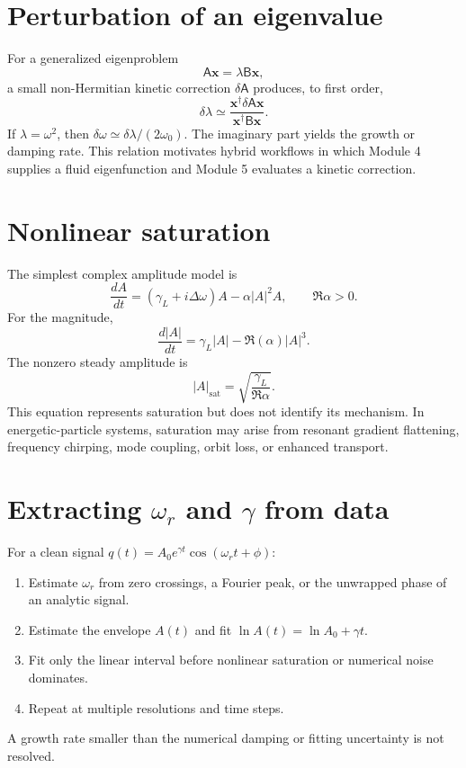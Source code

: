 \documentclass[11pt]{article}
\begin{document}
\section{Perturbation of an eigenvalue}
For a generalized eigenproblem
\begin{equation}
\mathsf A\mathbf x=\lambda\mathsf B\mathbf x,
\end{equation}
a small non-Hermitian kinetic correction $\delta\mathsf A$ produces, to first order,
\begin{equation}
\delta\lambda\simeq
\frac{\mathbf x^\dagger\delta\mathsf A\mathbf x}
{\mathbf x^\dagger\mathsf B\mathbf x}.
\end{equation}
If $\lambda=\omega^2$, then $\delta\omega\simeq\delta\lambda/(2\omega_0)$. The imaginary part yields the growth or damping rate. This relation motivates hybrid workflows in which Module 4 supplies a fluid eigenfunction and Module 5 evaluates a kinetic correction.

\section{Nonlinear saturation}
The simplest complex amplitude model is
\begin{equation}
\frac{dA}{dt}=(\gamma_L+i\Delta\omega)A-\alpha|A|^2A,
\qquad \Re\alpha>0.
\end{equation}
For the magnitude,
\begin{equation}
\frac{d|A|}{dt}=\gamma_L|A|-\Re(\alpha)|A|^3.
\end{equation}
The nonzero steady amplitude is
\begin{equation}
\boxed{|A|_{\mathrm{sat}}=\sqrt{\frac{\gamma_L}{\Re\alpha}}}.
\end{equation}
This equation represents saturation but does not identify its mechanism. In energetic-particle systems, saturation may arise from resonant gradient flattening, frequency chirping, mode coupling, orbit loss, or enhanced transport.

\section{Extracting $\omega_r$ and $\gamma$ from data}
For a clean signal $q(t)=A_0e^{\gamma t}\cos(\omega_rt+\phi)$:
\begin{enumerate}[leftmargin=1.6em]
\item Estimate $\omega_r$ from zero crossings, a Fourier peak, or the unwrapped phase of an analytic signal.
\item Estimate the envelope $A(t)$ and fit $\ln A(t)=\ln A_0+\gamma t$.
\item Fit only the linear interval before nonlinear saturation or numerical noise dominates.
\item Repeat at multiple resolutions and time steps.
\end{enumerate}
A growth rate smaller than the numerical damping or fitting uncertainty is not resolved.
\end{document}

